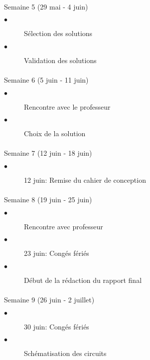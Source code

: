 \begin{multicols}{2}
\begin{description}
			\end{description}
		
		\paragraph{}
		Semaine 5 (29 mai - 4 juin)
			\begin{description}
				\item[$\bullet$] Sélection des solutions	
				\item[$\bullet$] Validation des solutions
			\end{description}
		
			
		\paragraph{}
		Semaine 6 (5 juin - 11 juin)
			\begin{description}
				\item[$\bullet$] Rencontre avec le professeur
				\item[$\bullet$] Choix de la solution			
				
    			    
			\end{description}		
		
		\paragraph{}
		Semaine 7 (12 juin - 18 juin)
			\begin{description}
				\item[$\bullet$] 12 juin: Remise du cahier de conception
			\end{description}
		
		\paragraph{}
		Semaine 8 (19 juin - 25 juin)
			\begin{description}
				\item[$\bullet$] Rencontre avec professeur
				\item[$\bullet$] 23 juin: Congés fériés
				\item[$\bullet$] Début de la rédaction du rapport final
				
			\end{description}
		\columnbreak
		\paragraph{}
		Semaine 9 (26 juin - 2 juillet)
			\begin{description}
				\item[$\bullet$] 30 juin: Congés fériés
				\item[$\bullet$] Schématisation	des circuits		
		\end{description}


\end{multicols}
